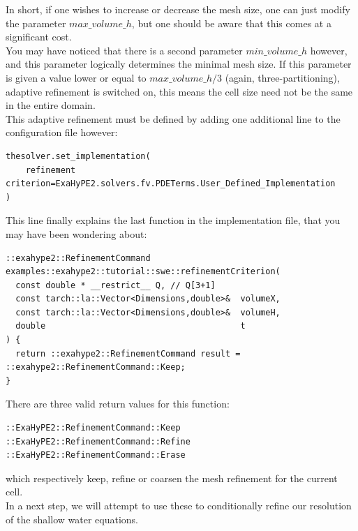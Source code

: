 \documentclass[12pt,letterpaper]{article}
\begin{document}
In short, if one wishes to increase or decrease the mesh size, one can just modify the parameter $max\_volume\_h$, but one should be aware that this comes at a significant cost.\\
You may have noticed that there is a second parameter $min\_volume\_h$ however, and this parameter logically determines the minimal mesh size. If this parameter is given a value lower or equal to $max\_volume\_h / 3$ (again, three-partitioning), adaptive refinement is switched on, this means the cell size need not be the same in the entire domain.\\
This adaptive refinement must be defined by adding one additional line to the configuration file however:\\

\begin{lstlisting}[style = Python]
thesolver.set_implementation(
    refinement criterion=ExaHyPE2.solvers.fv.PDETerms.User_Defined_Implementation
)
\end{lstlisting}

This line finally explains the last function in the implementation file, that you may have been wondering about:

\vspace{0.2cm}

\begin{lstlisting}[style = C++]
::exahype2::RefinementCommand examples::exahype2::tutorial::swe::refinementCriterion(
  const double * __restrict__ Q, // Q[3+1]
  const tarch::la::Vector<Dimensions,double>&  volumeX,
  const tarch::la::Vector<Dimensions,double>&  volumeH,
  double                                       t
) {
  return ::exahype2::RefinementCommand result = ::exahype2::RefinementCommand::Keep;
}
\end{lstlisting}

\vspace{0.2cm}

There are three valid return values for this function:

\begin{lstlisting}[style = C++]
::ExaHyPE2::RefinementCommand::Keep
::ExaHyPE2::RefinementCommand::Refine
::ExaHyPE2::RefinementCommand::Erase
\end{lstlisting}

which respectively keep, refine or coarsen the mesh refinement for the current cell.\\
In a next step, we will attempt to use these to conditionally refine our resolution of the shallow water equations.
\end{document}
